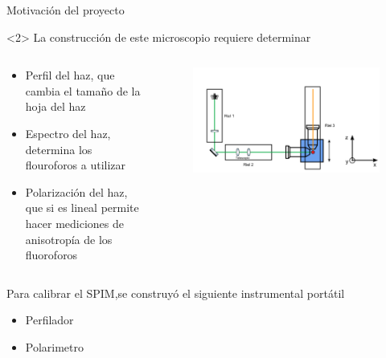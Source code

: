 \begin{frame}[t]{Motivación del proyecto}
    \begin{onlyenv}<2>
        La construcción de este microscopio requiere determinar
        \begin{columns}
            \begin{column}{0.5\textwidth}
                \begin{itemize}
                    \item Perfil del haz, que cambia el tamaño de la hoja del haz
                    \item Espectro del haz, determina los flouroforos a utilizar
                    \item Polarización del haz, que si es lineal permite hacer mediciones de anisotropía de los fluoroforos
                \end{itemize}
            \end{column}
            \begin{column}{0.5\textwidth}
                \begin{figure}[H]
                    \centering
                    \includegraphics[width=\textwidth]{fig/spim}
                    \label{fig:spim} 
                \end{figure}
            \end{column}
        \end{columns}
        \vspace{1em}
        Para calibrar el SPIM,se construyó el siguiente instrumental portátil
        \begin{itemize}
            \item Perfilador
            \item Polarimetro
        \end{itemize}
    \end{onlyenv}

\end{frame}

